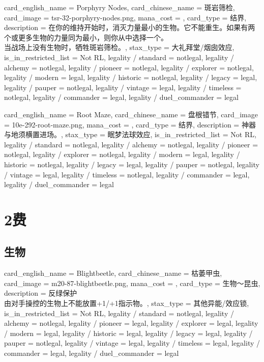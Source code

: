 \documentclass[lang = cn, color = black, 10pt]{AllThatStax}
\begin{document}
\card
{
	card_english_name = {Porphyry Nodes},
	card_chinese_name = {斑岩筛检},
	card_image = tsr-32-porphyry-nodes.png,
	mana_cost = ,
	card_type = 结界,
	description = {在你的维持开始时，消灭力量最小的生物。它不能重生。如果有两个或更多生物的力量同为最小，则你从中选择一个。\\
当战场上没有生物时，牺牲斑岩筛检。},
	stax_type = 大礼拜堂/烟囱效应,
	is_in_restricted_list = Not RL,
	legality / standard = notlegal,
	legality / alchemy = notlegal,
	legality / pioneer = notlegal,
	legality / explorer = notlegal,
	legality / modern = legal,
	legality / historic = notlegal,
	legality / legacy = legal,
	legality / pauper = notlegal,
	legality / vintage = legal,
	legality / timeless = notlegal,
	legality / commander = legal,
	legality / duel_commander = legal
}

\card
{
	card_english_name = {Root Maze},
	card_chinese_name = {盘根错节},
	card_image = 10e-292-root-maze.png,
	mana_cost = ,
	card_type = 结界,
	description = {神器与地须横置进场。},
	stax_type = 眠梦法球效应,
	is_in_restricted_list = Not RL,
	legality / standard = notlegal,
	legality / alchemy = notlegal,
	legality / pioneer = notlegal,
	legality / explorer = notlegal,
	legality / modern = legal,
	legality / historic = notlegal,
	legality / legacy = legal,
	legality / pauper = notlegal,
	legality / vintage = legal,
	legality / timeless = notlegal,
	legality / commander = legal,
	legality / duel_commander = legal
}

\chapter{2费}

\section{生物}

\card
{
	card_english_name = {Blightbeetle},
	card_chinese_name = {枯萎甲虫},
	card_image = m20-87-blightbeetle.png,
	mana_cost = ,
	card_type = 生物～昆虫,
	description = {反绿保护\\
由对手操控的生物上不能放置+1/+1指示物。},
	stax_type = 其他异能/效应锁,
	is_in_restricted_list = Not RL,
	legality / standard = notlegal,
	legality / alchemy = notlegal,
	legality / pioneer = legal,
	legality / explorer = legal,
	legality / modern = legal,
	legality / historic = legal,
	legality / legacy = legal,
	legality / pauper = notlegal,
	legality / vintage = legal,
	legality / timeless = legal,
	legality / commander = legal,
	legality / duel_commander = legal
}
\end{document}
